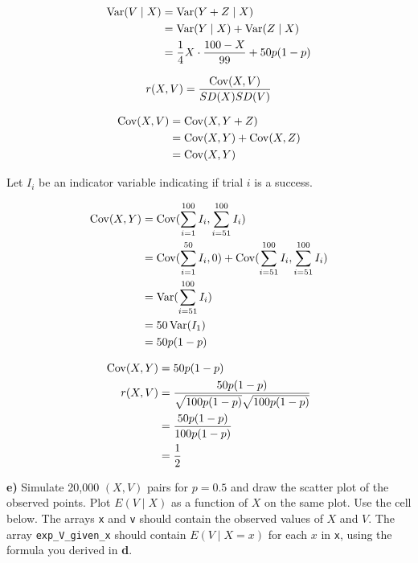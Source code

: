 \documentclass[11pt]{article}
\begin{document}
\begin{align*}
	\operatorname{Var}(V \mid X) &= \operatorname{Var}(Y + Z \mid X) \\
	&= \operatorname{Var}(Y \mid X) + \operatorname{Var}(Z \mid X) \\
	&= \frac{1}{4} X \cdot \frac{100-X}{99} + 50p(1-p) \\
\end{align*}


$$
	r(X,V) = \frac{\operatorname{Cov}(X,V)}{SD(X)SD(V)} 
$$


\begin{align*}
	\operatorname{Cov}(X, V) &= \operatorname{Cov}(X, Y + Z) \\
	&= \operatorname{Cov}(X, Y) + \operatorname{Cov}(X, Z) \\
	&= \operatorname{Cov}(X, Y) \\
\end{align*}

Let $I_{i}$ be an indicator variable indicating if trial $i$ is a success.

\begin{align*}
	\operatorname{Cov}(X,Y) &= \operatorname{Cov}(\sum_{i=1}^{100} I_{i}, \sum_{i=51}^{100} I_{i})\\
&= \operatorname{Cov}(\sum_{i=1}^{50} I_{i}, 0) + \operatorname{Cov}(\sum_{i=51}^{100} I_{i}, \sum_{i=51}^{100} I_{i}) \\
&= \operatorname{Var}(\sum_{i=51}^{100} I_{i}) \\
&= 50 \operatorname{Var}(I_{1}) \\
&= 50 p(1-p) \\
\end{align*}


\begin{align*}
	\operatorname{Cov}(X, Y) &= 50p(1-p) \\
	r(X,V) &= \frac{50p(1-p)}{\sqrt{100 p(1-p)}{\sqrt{100 p(1-p)}}} \\
	&= \frac{50p(1-p)}{100p(1-p)} \\
	&= \frac{1}{2} \\
\end{align*}


\textbf{e)} Simulate 20,000 \((X, V)\) pairs for \(p = 0.5\) and draw
the scatter plot of the observed points. Plot \(E(V \mid X)\) as a
function of \(X\) on the same plot. Use the cell below. The arrays
\texttt{x} and \texttt{v} should contain the observed values of \(X\)
and \(V\). The array \texttt{exp\_V\_given\_x} should contain
\(E(V \mid X = x)\) for each \(x\) in \texttt{x}, using the formula you
derived in \textbf{d}.
 
\end{document}
